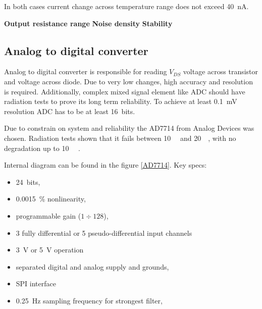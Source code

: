         In both cases current change across temperature range does not exceed \SI{40}{\nano\ampere}.

        \bigskip\textbf{Output resistance range}
        \bigskip\textbf{Noise density}
        \bigskip\textbf{Stability}

    \subsection{Analog to digital converter}
        Analog to digital converter is responsible for reading $V_{DS}$ voltage across transistor and voltage across diode. Due to very low changes, high accuracy and resolution is required. Additionally, complex mixed signal element like ADC should have radiation tests to prove its long term reliability. To achieve at least \SI{0.1}{\milli\volt} resolution ADC has to be at least \SI{16}{bits}.

        Due to constrain on system and reliability the AD7714 from Analog Devices was chosen. Radiation tests shown that it fails between \SI{10}{\kilo\rad} and \SI{20}{\kilo\rad}, with no degradation up to \SI{10}{\kilo\rad} \cite{ADC_radiation_tests}.

        Internal diagram can be found in the figure \ref{AD7714}. Key specs:
        \begin{itemize}
            \item \SI{24}{bits},
            \item \SI{0.0015}{\percent} nonlinearity,
            \item programmable gain ($1 \div 128$),
            \item 3 fully differential or 5 pseudo-differential input channels
            \item \SI{3}{\volt} or \SI{5}{\volt} operation
            \item separated digital and analog supply and grounds,
            \item SPI interface
            \item \SI{0.25}{\hertz} sampling frequency for strongest filter,
        \end{itemize}

